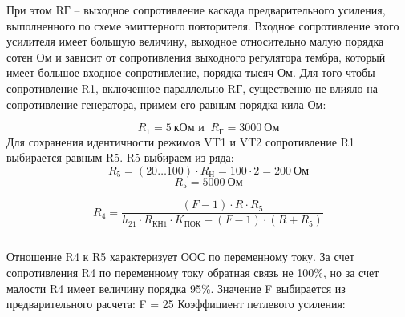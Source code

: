 При этом RГ – выходное сопротивление каскада предварительного усиления, выполненного по схеме эмиттерного повторителя. Входное сопротивление этого усилителя имеет большую величину, выходное относительно малую порядка сотен Ом и зависит от сопротивления выходного регулятора тембра, который имеет большое входное сопротивление, порядка тысяч Ом.
Для того чтобы сопротивление R1, включенное параллельно RГ, существенно не влияло на сопротивление генератора, примем его равным порядка кила Ом:

\begin{equation}
\label{eq:equation4_8}
R_1= 5~\text{кОм и }~R_{\text{Г}} = 3000 ~\text{Ом} 
\end{equation}
\begin{equation}
\label{eq:equation4_9}

\end{equation}
\begin{equation}
\label{eq:equation4_10}

\end{equation}
Для сохранения идентичности режимов VT1 и VT2 сопротивление R1 выбирается равным R5. R5 выбираем из ряда:
\begin{equation}
\label{eq:equation4_11}
R_{\text{5}}=(20 \ldots 100) \cdot R_{\text{Н}}=100 \cdot 2 = 200~\text{Ом}
\end{equation}
\begin{equation}
\label{eq:equation4_12}
R_{\text{5}}=5000~\text{Ом}
\end{equation}

\begin{equation}
\label{eq:equation4_13}
R_4=\dfrac{(F-1) \cdot R \cdot R_5}{h_{\text{21}} \cdot R_{\text{КН1}} \cdot K_{\text{ПОК}}-(F-1)\cdot (R+R_{\text{5}})}
\end{equation}
\begin{equation*}

\end{equation*}

\begin{equation}
\label{eq:equation4_14}

\end{equation}

Отношение R4  к R5 характеризует ООС по переменному току. За счет сопротивления R4 по переменному току обратная связь не 100\%, но за счет малости R4 имеет величину порядка 95\%.
Значение F выбирается из предварительного расчета: F = 25
Коэффициент петлевого усиления:

\begin{equation}
\label{eq:equation4_15}

\end{equation}

